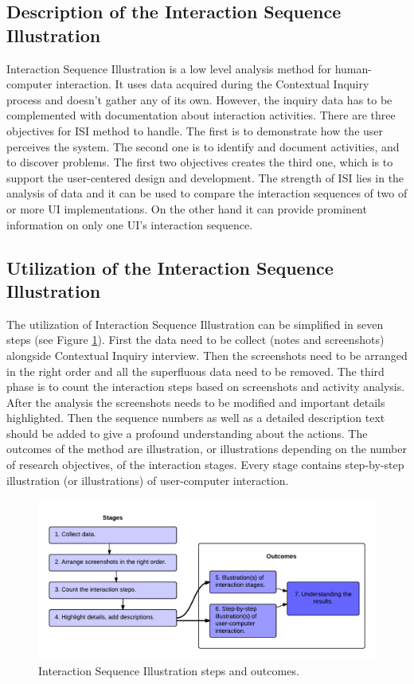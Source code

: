 \documentclass[12pt,a4paper,oneside,pdftex]{report}
\begin{document}
\subsection{Description of the Interaction Sequence Illustration}
Interaction Sequence Illustration is a low level analysis method for human-computer interaction. It uses data acquired during the Contextual Inquiry process and doesn't gather any of its own. However, the inquiry data has to be complemented with documentation 			about 	interaction activities. There are three objectives for ISI method to handle. The first is to demonstrate how the user perceives the system. The second one is to identify and document activities, and to discover problems. The first two objectives creates the 			third one, which is to support the user-centered design and development. \cite{RefWorks:17}  The strength of ISI lies in the analysis of data and it can be used to compare the interaction sequences of two of or more UI implementations. On the other hand it can 			provide prominent information on only one UI's interaction sequence. 

\subsection{Utilization of the Interaction Sequence Illustration}
The utilization of Interaction Sequence Illustration can be simplified in seven steps (see Figure \ref{fig:isi_chart}). First the data need to be collect (notes and screenshots) alongside Contextual Inquiry interview.
Then the screenshots need to be arranged in the right order and all the superfluous data need to be removed. The third phase is to count the interaction steps based on screenshots and activity analysis.
After the analysis the screenshots needs to be modified and important details highlighted. Then the sequence numbers as well as a  detailed description text should be added to give a profound understanding about the actions. The outcomes of the method are 			illustration, or illustrations depending on the number of research objectives, of the interaction stages. Every stage contains step-by-step illustration (or illustrations) of user-computer interaction. \cite{RefWorks:17}
	
\begin{figure}[H]
  	\centering
  	\includegraphics[width=1.1\textwidth]{./images/isi_chart.png}
  	\caption{Interaction Sequence Illustration steps and outcomes.}
	\label{fig:isi_chart}
\end{figure}
\end{document}
